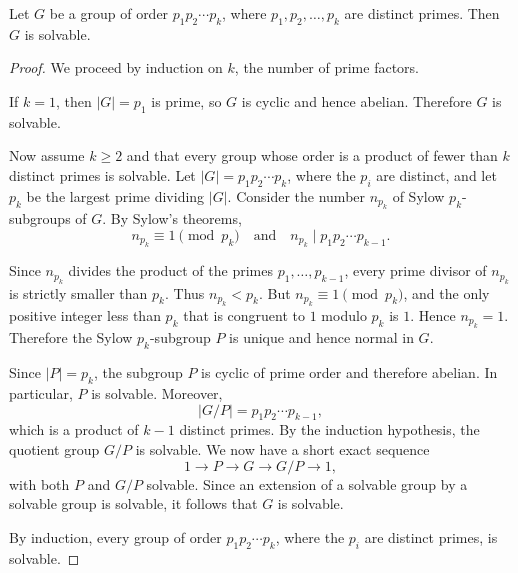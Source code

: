 \documentclass[10pt,a4paper]{amsart}
\begin{document}
\begin{prop}
Let $G$ be a group of order $p_1 p_2 \cdots p_k$, where $p_1, p_2, \dots, p_k$ are distinct primes. Then $G$ is solvable.
\end{prop}

\begin{proof}
We proceed by induction on $k$, the number of prime factors.

If $k=1$, then $|G|=p_1$ is prime, so $G$ is cyclic and hence abelian. Therefore $G$ is solvable.

Now assume $k\ge 2$ and that every group whose order is a product of fewer than $k$ distinct primes is solvable. Let $|G|=p_1p_2\cdots p_k$,
where the $p_i$ are distinct, and let $p_k$ be the largest prime dividing $|G|$. Consider the number $n_{p_k}$ of Sylow $p_k$-subgroups of $G$. By Sylow's theorems,
\[
n_{p_k}\equiv 1 \pmod{p_k} \quad \text{and} \quad 
n_{p_k}\mid p_1p_2\cdots p_{k-1}.
\]

Since $n_{p_k}$ divides the product of the primes $p_1,\dots,p_{k-1}$, every prime divisor of $n_{p_k}$ is strictly smaller than $p_k$. Thus $n_{p_k}<p_k$. 
But $n_{p_k}\equiv 1 \pmod{p_k}$, and the only positive integer less than $p_k$ that is congruent to $1$ modulo $p_k$ is $1$. Hence $n_{p_k}=1$. 
Therefore the Sylow $p_k$-subgroup $P$ is unique and hence normal in $G$.

Since $|P|=p_k$, the subgroup $P$ is cyclic of prime order and therefore abelian. In particular, $P$ is solvable. Moreover,
\[
|G/P|=p_1p_2\cdots p_{k-1},
\]
which is a product of $k-1$ distinct primes. By the induction hypothesis, the quotient group $G/P$ is solvable.
We now have a short exact sequence
\[
1 \longrightarrow P \longrightarrow G \longrightarrow G/P \longrightarrow 1,
\]
with both $P$ and $G/P$ solvable. Since an extension of a solvable group by a solvable group is solvable, it follows that $G$ is solvable.

By induction, every group of order $p_1p_2\cdots p_k$, where the $p_i$ are distinct primes, is solvable.
\end{proof}
\end{document}
